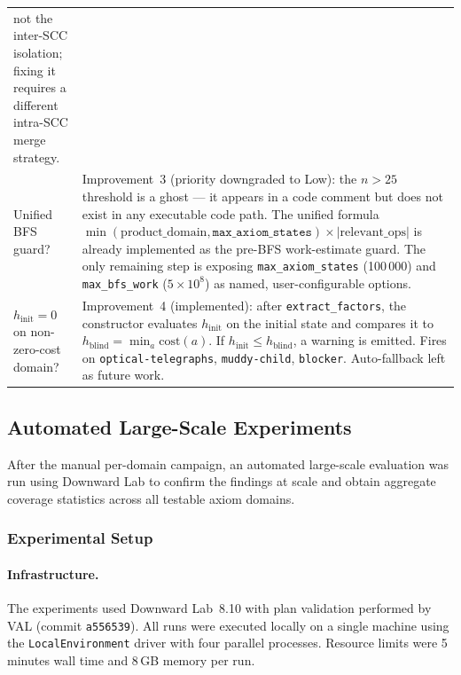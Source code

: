 \documentclass[11pt,a4paper]{article}
\begin{document}
\begin{center}
\begin{tabular}{lp{9.5cm}}
  not the inter-SCC isolation; fixing it requires a different intra-SCC
  merge strategy. \\[3pt]
Unified BFS guard? & Improvement~3 (priority downgraded to Low): the
  $n>25$ threshold is a ghost --- it appears in a code comment but does not
  exist in any executable code path.  The unified formula
  $\min(\text{product\_domain}, \texttt{max\_axiom\_states})
   \times \lvert\text{relevant\_ops}\rvert$ is already implemented as the
  pre-BFS work-estimate guard.  The only remaining step is exposing
  \texttt{max\_axiom\_states} (100\,000) and \texttt{max\_bfs\_work}
  ($5\times10^8$) as named, user-configurable options. \\[3pt]
$h_{\mathrm{init}}=0$ on non-zero-cost domain? & Improvement~4 (implemented):
  after \texttt{extract\_factors}, the constructor evaluates $h_{\mathrm{init}}$
  on the initial state and compares it to
  $h_{\mathrm{blind}} = \min_a \mathrm{cost}(a)$.  If
  $h_{\mathrm{init}} \leq h_{\mathrm{blind}}$, a warning is emitted.
  Fires on \texttt{optical-telegraphs}, \texttt{muddy-child}, \texttt{blocker}.
  Auto-fallback left as future work. \\
\bottomrule
\end{tabular}
\end{center}

\subsection{Automated Large-Scale Experiments}
\label{sec:automated-experiments}

After the manual per-domain campaign, an automated large-scale evaluation was
run using Downward Lab to confirm the findings at scale and obtain aggregate
coverage statistics across all testable axiom domains.

\subsubsection{Experimental Setup}

\paragraph{Infrastructure.}
The experiments used Downward Lab~8.10 with plan validation performed by
VAL (commit \texttt{a556539}).  All runs were executed locally on a single
machine using the \texttt{LocalEnvironment} driver with four parallel
processes.  Resource limits were 5 minutes wall time and 8\,GB memory per run.
\end{document}
